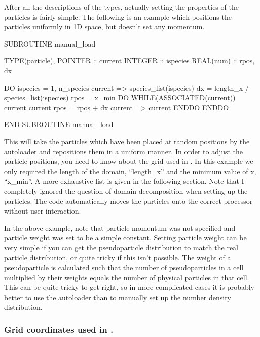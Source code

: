 After all the descriptions of the types, actually setting the properties of
the particles is fairly simple. The following is an example which positions
the particles uniformly in 1D space, but doesn't set any momentum.
\begin{boxverbatim}
  SUBROUTINE manual_load

    TYPE(particle), POINTER :: current
    INTEGER :: ispecies
    REAL(num) :: rpos, dx

    DO ispecies = 1, n_species
      current => species_list(ispecies)%
      dx = length_x / species_list(ispecies)%
      rpos = x_min
      DO WHILE(ASSOCIATED(current))
        current%
        current%
        rpos = rpos + dx
        current => current%
      ENDDO
    ENDDO

  END SUBROUTINE manual_load
\end{boxverbatim}

This will take the particles which have been placed at random positions
by the autoloader and repositions them in a uniform manner. In order to
adjust the particle positions, you need to know about the grid used in
{\EPOCH}. In this example we only required the length of the domain,
``length\_x'' and the minimum value of x, ``x\_min''. A more exhaustive
list is given in the following section. Note that
I completely ignored the question of domain decomposition when setting up the
particles. The code automatically moves the particles onto the correct
processor without user interaction.

In the above example, note that particle momentum was not specified and
particle weight was set to be a simple constant. Setting particle weight can
be very simple if you can get the pseudoparticle distribution to match the
real particle distribution, or quite tricky if this isn't possible. The
weight of a pseudoparticle is calculated such that the number of
pseudoparticles in a cell multiplied by their weights equals the number
of physical particles in that cell.
This can be quite tricky to get right, so in more complicated
cases it is probably better to use the autoloader than to manually set up the
number density distribution.

\subsubsection{\texorpdfstring
  {Grid coordinates used in {\EPOCH}.}
  {Grid coordinates used in {EPOCH}.}}

